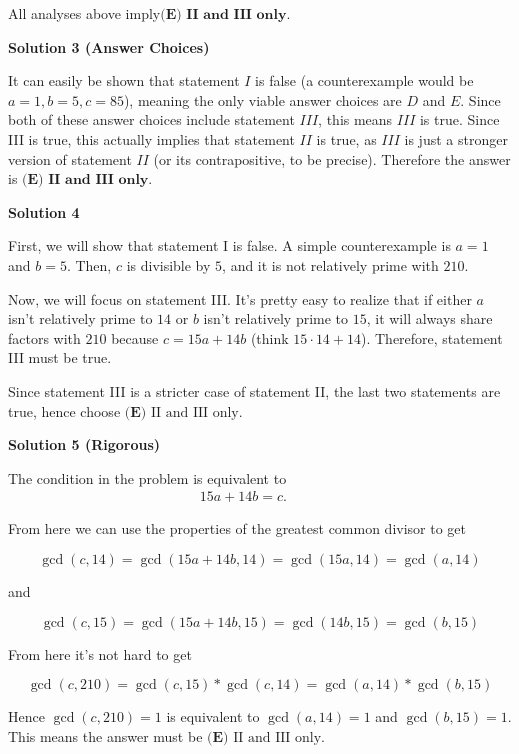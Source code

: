 \begin{enumerate}
 All analyses above imply$\boxed{\textbf{(E) II and III only}}.$




\textbf{Solution 3 (Answer Choices)}

It can easily be shown that statement $I$ is false (a counterexample would be $a=1, b=5, c=85$), meaning the only viable answer choices are $D$ and $E$. Since both of these answer choices include statement $III$, this means $III$ is true. Since III is true, this actually implies that statement $II$ is true, as $III$ is just a stronger version of statement $II$ (or its contrapositive, to be precise). Therefore the answer is $\boxed{\textbf{(E) II and III only}}.$




\textbf{Solution 4}

First, we will show that statement I is false. A simple counterexample is $a=1$ and $b=5$. Then, $c$ is divisible by $5$, and it is not relatively prime with $210$.

 
Now, we will focus on statement III. It's pretty easy to realize that if either $a$ isn't relatively prime to $14$ or $b$ isn't relatively prime to $15$, it will always share factors with $210$ because $c = 15a + 14b$ (think $15 \cdot 14 + 14$). Therefore, statement III must be true. 

 
Since statement III is a stricter case of statement II, the last two statements are true, hence choose $\boxed{\textbf{(E) }\text{II and III only}}.$




\textbf{Solution 5 (Rigorous)}

The condition in the problem is equivalent to\begin{align*}15 a + 14 b = c. \hspace{1cm} \end{align*}


 From here we can use the properties of the greatest common divisor to get

 
 \[\gcd(c, 14)=\gcd(15a+14b, 14)=\gcd(15a, 14)=\gcd(a, 14)\]

 and

 
 \[\gcd(c, 15)=\gcd(15a+14b, 15)=\gcd(14b, 15)=\gcd(b, 15)\]

 From here it's not hard to get

 
 \[\gcd(c, 210)=\gcd(c, 15)*\gcd(c, 14)=\gcd(a, 14)*\gcd(b, 15)\]

 Hence $\gcd(c, 210)=1$ is equivalent to $\gcd(a, 14)=1$ and $\gcd(b, 15)=1$. This means the answer must be $\boxed{\textbf{(E) }\text{II and III only}}.$





\end{enumerate}
